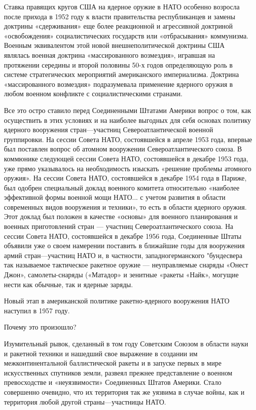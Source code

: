 \documentclass[12pt, a4paper, openany]{book}
\begin{document}
	Ставка правящих кругов США на ядерное оружие в НАТО особенно возросла после прихода в 1952 году к власти правительства республиканцев и замены доктрины «сдерживания» еще более реакционной и агрессивной доктриной «освобождения» социалистических государств или «отбрасывания» коммунизма. Военным эквивалентом этой новой внешнеполитической доктрины США являлась военная доктрина «массированного возмездия», игравшая на протяжении середины и второй половины 50-х годов определяющую роль в системе стратегических мероприятий американского империализма. Доктрина «массированного возмездия» подразумевала применение ядерного оружия в любом военном конфликте с социалистическими странами.
	
	Все это остро ставило перед Соединенными Штатами Америки вопрос о том, как осуществить в этих условиях и на наиболее выгодных для себя основах политику ядерного вооружения стран—участниц Североатлантической военной группировки. На сессии Совета НАТО, состоявшейся в апреле 1953 года, впервые был поставлен вопрос об атомном вооружении Североатлантического союза. В коммюнике следующей сессии Совета НАТО, состоявшейся в декабре 1953 года, уже прямо указывалось на необходимость изыскать «решение проблемы атомного оружия». На сессии Совета НАТО, состоявшейся в декабре 1954 года в Париже, был одобрен специальный доклад военного комитета относительно «наиболее эффективной формы военной мощи НАТО... с учетом развития в области современных видов вооружения и техники», то есть в области ядерного оружия. Этот доклад был положен в качестве «основы» для военного планирования и военных приготовлений стран — участниц Североатлантического союза. На сессии Совета НАТО, состоявшейся в декабре 1956 года, Соединенные Штаты объявили уже о своем намерении поставить в ближайшие годы для вооружения армий стран—участниц НАТО и, в частности, западногерманского "бундесвера так называемое тактическое ракетное оружие — неуправляемые снаряды «Онест Джон», самолеты-снаряды («Матадор» и зенитные «ракеты «Найк», могущие нести как обычные, так и ядерные заряды.
	
	Новый этап в американской политике ракетно-ядерного вооружения НАТО наступил в 1957 году.
	
	Почему это произошло?
	
	
	Изумительный рывок, сделанный в том году Советским Союзом в области науки и ракетной техники и нашедший свое выражение в создании им межконтинентальной баллистической ракеты и в запуске первых в мире искусственных спутников земли, развеял прежнее представление о военном превосходстве и «неуязвимости» Соединенных Штатов Америки. Стало совершенно очевидно, что их территория так же уязвима в случае войны, как и территория любой другой страны—участницы НАТО.
	
\end{document}

